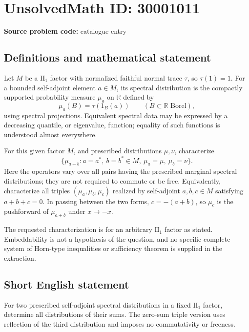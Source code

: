 \documentclass[11pt]{article}
\newcommand{\R}{\mathbb{R}}
\begin{document}
\section*{UnsolvedMath ID: 30001011}
\textbf{Source problem code:} catalogue entry
\subsection{Definitions and mathematical statement}
Let \(M\) be a \(\mathrm{II}_1\) factor with normalized faithful normal trace \(\tau\), so \(\tau(1)=1\). For a bounded self-adjoint element \(a\in M\), its spectral distribution is the compactly supported probability measure \(\mu_a\) on \(\R\) defined by
\[
\mu_a(B)=\tau(1_B(a))\qquad(B\subset\R\text{ Borel}),
\]
using spectral projections. Equivalent spectral data may be expressed by a decreasing quantile, or eigenvalue, function; equality of such functions is understood almost everywhere.

For this given factor \(M\), and prescribed distributions \(\mu,\nu\), characterize
\[
\{\mu_{a+b}:a=a^*,\ b=b^*\in M,\ \mu_a=\mu,\ \mu_b=\nu\}.
\]
Here the operators vary over all pairs having the prescribed marginal spectral distributions; they are not required to commute or be free. Equivalently, characterize all triples \((\mu_a,\mu_b,\mu_c)\) realized by self-adjoint \(a,b,c\in M\) satisfying \(a+b+c=0\). In passing between the two forms, \(c=-(a+b)\), so \(\mu_c\) is the pushforward of \(\mu_{a+b}\) under \(x\mapsto-x\).

The requested characterization is for an arbitrary \(\mathrm{II}_1\) factor as stated. Embeddability is not a hypothesis of the question, and no specific complete system of Horn-type inequalities or sufficiency theorem is supplied in the extraction.
\subsection{Short English statement}
For two prescribed self-adjoint spectral distributions in a fixed \(\mathrm{II}_1\) factor, determine all distributions of their sums. The zero-sum triple version uses reflection of the third distribution and imposes no commutativity or freeness.
\end{document}
